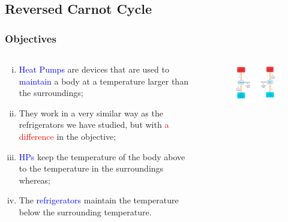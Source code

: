 \documentclass[10pt,compress]{beamer}
\begin{document}
\subsection{Reversed Carnot Cycle}
\begin{frame}
 \frametitle{Objectives}
  \begin{columns}
   \begin{column}[c]{0.45\linewidth}
  \begin{enumerate}[(i)]
   \item <1-> \textcolor{blue}{Heat Pumps} are devices that are used to \textcolor{blue}{maintain} a body at a temperature larger than the surroundings;
   \item <2-> They work in a very similar way as the refrigerators we have studied, but with \textcolor{red}{a difference} in the objective;
   \item <3-> \textcolor{blue}{HPs} keep the temperature of the body above to the temperature in the surroundings whereas;
   \item <4-> The \textcolor{blue}{refrigerators} maintain the temperature below the surrounding temperature.
  \end{enumerate}
   \end{column}
   \begin{column}[c]{0.55\linewidth}
    \begin{figure}%
     \begin{center}
      \includegraphics[width=7.5cm,clip]{./Pics/Overview_Refrig2}
     \end{center}
    \end{figure}  
   \end{column}  
  \end{columns}
\end{frame}
\end{document}
